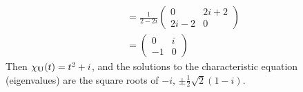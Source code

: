 \documentclass[fleqn,a4paper,11pt]{article}
\begin{document}
\begin{enumerate}[label=\textbf{\arabic*.}]
\begin{align*}
   &=
   \frac 1{2 - 2i}
   \begin{pmatrix}
    0 & 2i + 2 \\
    2i - 2 & 0
   \end{pmatrix} \\
   &=
   \begin{pmatrix}
    0 & i \\
    -1 & 0
   \end{pmatrix}
  \end{align*}
  Then \(\chi_{\mathbf{U}}(t) = t^2 + i\), and the solutions to the characteristic
  equation (eigenvalues) are the square roots of \(-i\),
  \(\pm \frac 12 \sqrt 2(1 - i)\).
 \end{enumerate}
\end{document}
